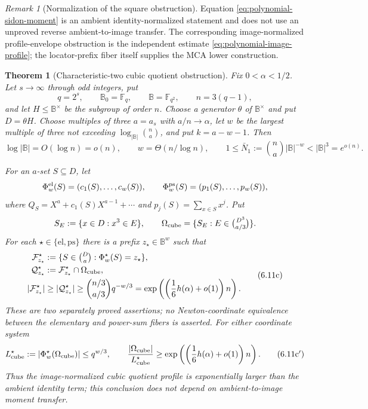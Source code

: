 \documentclass[12pt,a4paper]{amsart}
\numberwithin{equation}{section}
\newtheorem{theorem}{Theorem}[section]
\theoremstyle{remark}
\newtheorem{remark}[remark]{Remark}
\newcommand{\F}{\mathbb F}
\newcommand{\B}{\mathbb B}
\newcommand{\abs}[1]{\lvert #1\rvert}
\begin{document}
\begin{remark}[Normalization of the square obstruction]
\label{rem:odd-ambient-image}
Equation \eqref{eq:polynomial-sidon-moment} is an ambient
identity-normalized statement and does not use an unproved reverse
ambient-to-image transfer.  The corresponding image-normalized
profile-envelope obstruction is the independent estimate
\eqref{eq:polynomial-image-profile}; the locator-prefix fiber itself
supplies the MCA lower construction.
\end{remark}

\begin{theorem}[Characteristic-two cubic quotient obstruction]
\label{thm:binary-cubic-obstruction}
Fix \(0<\alpha<1/2\).  Let \(s\to\infty\) through odd integers, put
\[
 q=2^s,\qquad \B_0=\F_q,\qquad \B=\F_{q^2},\qquad n=3(q-1),
 \tag{6.11a}\label{eq:binary-cubic-tower}
\]
and let \(H\le\B^\times\) be the subgroup of order \(n\).  Choose a
generator \(\theta\) of \(\B^\times\) and put \(D=\theta H\).  Choose
multiples of three \(a=a_s\) with \(a/n\to\alpha\), let \(w\) be the
largest multiple of three not exceeding
\(\log_{\abs\B}\binom na\), and put \(k=a-w-1\).  Then
\[
 \log\abs\B=O(\log n)=o(n),\qquad
 w=\Theta(n/\log n),\qquad
 1\le\bar N_1:=\binom na\abs\B^{-w}<\abs\B^3=e^{o(n)}.
 \tag{6.11b}\label{eq:binary-identity-scale}
\]

For an \(a\)-set \(S\subseteq D\), let
\[
 \Phi_w^{\rm el}(S)=(c_1(S),\ldots,c_w(S)),\qquad
 \Phi_w^{\rm ps}(S)=(p_1(S),\ldots,p_w(S)),
\]
where \(Q_S=X^a+c_1(S)X^{a-1}+\cdots\) and
\(p_j(S)=\sum_{x\in S}x^j\).  Put
\[
 S_E:=\{x\in D:x^3\in E\},\qquad
 \Omega_{\rm cube}=\{S_E:E\in\tbinom{D^3}{a/3}\}.
\]
For each
\(\star\in\{\mathrm{el},\mathrm{ps}\}\) there is a prefix
\(z_\star\in\B^w\) such that
\[
 \begin{split}
 \mathcal F^\star_{z_\star}
   &:=\{S\in\tbinom Da:\Phi_w^\star(S)=z_\star\},\\
 \mathcal Q^\star_{z_\star}
   &:=\mathcal F^\star_{z_\star}\cap\Omega_{\rm cube},\\
 \abs{\mathcal F^\star_{z_\star}}
   &\ge\abs{\mathcal Q^\star_{z_\star}}
    \ge \binom{n/3}{a/3}q^{-w/3}
    =\exp\left(\left(\frac16h(\alpha)+o(1)\right)n\right).
 \end{split}
 \tag{6.11c}\label{eq:binary-cubic-large-fibers}
\]
These are two separately proved assertions; no Newton-coordinate
equivalence between the elementary and power-sum fibers is asserted.
For either coordinate system
\[
 L_{\rm cube}^\star
   :=\abs{\Phi_w^\star(\Omega_{\rm cube})}\le q^{w/3},
 \qquad
 \frac{\abs{\Omega_{\rm cube}}}{L_{\rm cube}^\star}
 \ge\exp\left(\left(\frac16h(\alpha)+o(1)\right)n\right).
 \tag{6.11c$'$}\label{eq:binary-cubic-image-profile}
\]
Thus the image-normalized cubic quotient profile is exponentially larger
than the ambient identity term; this conclusion does not depend on
ambient-to-image moment transfer.


\end{theorem}
\end{document}
